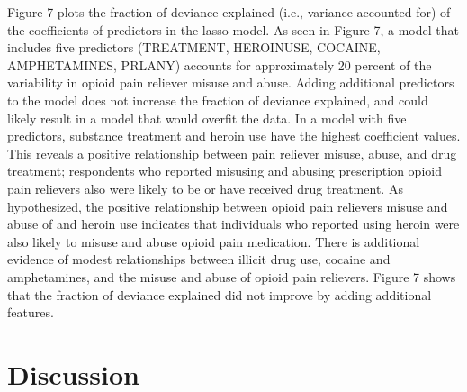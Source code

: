 \documentclass[sigconf]{acmart}
\begin{document}

Figure 7 plots the fraction of deviance explained (i.e., variance accounted 
for) of the coefficients of predictors in the lasso model. As seen in 
Figure 7, a model that includes five predictors (TREATMENT, HEROINUSE, 
COCAINE, AMPHETAMINES, PRLANY) accounts for approximately 20 percent of the 
variability in opioid pain reliever misuse and abuse. Adding additional 
predictors to the model does not increase the fraction of deviance explained, 
and could likely result in a model that would overfit the data. In a model 
with five predictors, substance treatment and heroin use have the highest 
coefficient values. This reveals a positive relationship between pain reliever 
misuse, abuse, and drug treatment; respondents who reported misusing and 
abusing prescription opioid pain relievers also were likely to be or have
received drug treatment. As hypothesized, the positive relationship between 
opioid pain relievers misuse and abuse of and heroin use indicates that
individuals who reported using heroin were also likely to misuse and abuse 
opioid pain medication. There is additional evidence of modest relationships 
between illicit drug use, cocaine and amphetamines, and the misuse and abuse 
of opioid pain relievers. Figure 7 shows that the fraction of deviance
explained did not improve by adding additional features.



\section{Discussion}
\end{document}
